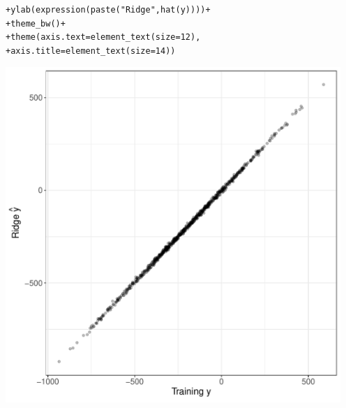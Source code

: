 \documentclass[12pt]{article}\usepackage[]{graphicx}\usepackage[]{color}
\makeatletter
\newcommand{\hlnum}[1]{\textcolor[rgb]{0.82,0.78,0.62}{#1}}%
\newcommand{\hlstr}[1]{\textcolor[rgb]{0.82,0.78,0.62}{#1}}%
\newcommand{\hlopt}[1]{\textcolor[rgb]{0.882,0.878,0.898}{#1}}%
\newcommand{\hlstd}[1]{\textcolor[rgb]{0.882,0.878,0.898}{#1}}%
\newcommand{\hlkwc}[1]{\textcolor[rgb]{0.812,0.522,0.388}{#1}}%
\newcommand{\hlkwd}[1]{\textcolor[rgb]{0.733,0.388,0.812}{#1}}%
\newenvironment{kframe}{%
 \def\at@end@of@kframe{}%
 \ifinner\ifhmode%
  \def\at@end@of@kframe{\end{minipage}}%
  \begin{minipage}{\columnwidth}%
 \fi\fi%
 \def\FrameCommand##1{\hskip\@totalleftmargin \hskip-\fboxsep
 \colorbox{shadecolor}{##1}\hskip-\fboxsep
     \hskip-\linewidth \hskip-\@totalleftmargin \hskip\columnwidth}%
 \MakeFramed {\advance\hsize-\width
   \@totalleftmargin\z@ \linewidth\hsize
   \@setminipage}}%
 {\par\unskip\endMakeFramed%
 \at@end@of@kframe}
\newenvironment{knitrout}{}{} %
\makeatother
\begin{document}
\begin{flushleft}
\begin{center}
\begin{knitrout}
\begin{kframe}
\begin{alltt}
\hlstd{+ }     \hlkwd{ylab}\hlstd{(} \hlkwd{expression}\hlstd{(}\hlkwd{paste}\hlstd{(}\hlstr{"Ridge "}\hlstd{,} \hlkwd{hat}\hlstd{(y))))}\hlopt{+}
\hlstd{+ }     \hlkwd{theme_bw}\hlstd{()}\hlopt{+}
\hlstd{+ }     \hlkwd{theme}\hlstd{(}\hlkwc{axis.text} \hlstd{=} \hlkwd{element_text}\hlstd{(}\hlkwc{size}\hlstd{=}\hlnum{12}\hlstd{),}
\hlstd{+ }          \hlkwc{axis.title} \hlstd{=} \hlkwd{element_text}\hlstd{(}\hlkwc{size}\hlstd{=}\hlnum{14}\hlstd{))}
\end{alltt}
\end{kframe}
\includegraphics[width=5in]{figure/RidgeNetML1-1} 

\end{knitrout}
\end{center}


\end{flushleft}
\end{document}
